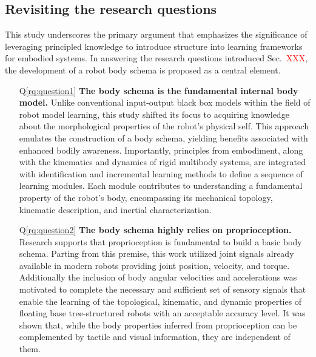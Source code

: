 \documentclass[12pt, a4paper]{article}
\newcommand{\redtext}[1]{\textcolor{red}{#1}}
\begin{document}
\subsection*{Revisiting the research questions}
This study underscores the primary argument that emphasizes the significance of leveraging principled knowledge to introduce structure into learning frameworks for embodied systems.
In answering the research questions introduced Sec.~\redtext{XXX}, the development of a robot body schema is proposed as a central element. 

\begin{itemize}
	\item[Q\ref{rq:question1}] \textbf{The body schema is the fundamental internal body model.} %
	Unlike conventional input-output black box models within the field of robot model learning, this study shifted its focus to acquiring knowledge about the morphological properties of the robot's physical self. This approach emulates the construction of a body schema, yielding benefits associated with enhanced bodily awareness. Importantly, principles from embodiment, along with the kinematics and dynamics of rigid multibody systems, are integrated with identification and incremental learning methods to define a sequence of learning modules. Each module contributes to understanding a fundamental property of the robot's body, encompassing its mechanical topology, kinematic description, and inertial characterization. 
	
	\item[Q\ref{rq:question2}] \textbf{The body schema highly relies on proprioception.} Research supports that proprioception is fundamental to build a basic body schema. Parting from this premise, this work utilized joint signals already available in modern robots providing joint position, velocity, and torque. Additionally the inclusion of body angular velocities and accelerations was motivated to complete the necessary and sufficient set of sensory signals that enable the learning of the topological, kinematic, and dynamic properties of floating base tree-structured robots with an acceptable accuracy level. It was shown that, while the body properties inferred from proprioception can be complemented by tactile and visual information, they are independent of them.
	

\end{itemize}
\end{document}
